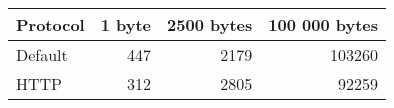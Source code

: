 \begin{tabular}{lrrr}
\hline
 Protocol   &   1 byte &   2500 bytes &   100 000 bytes \\
\hline
 Default    &      447 &         2179 &          103260 \\
 HTTP       &      312 &         2805 &           92259 \\
\hline
\end{tabular}